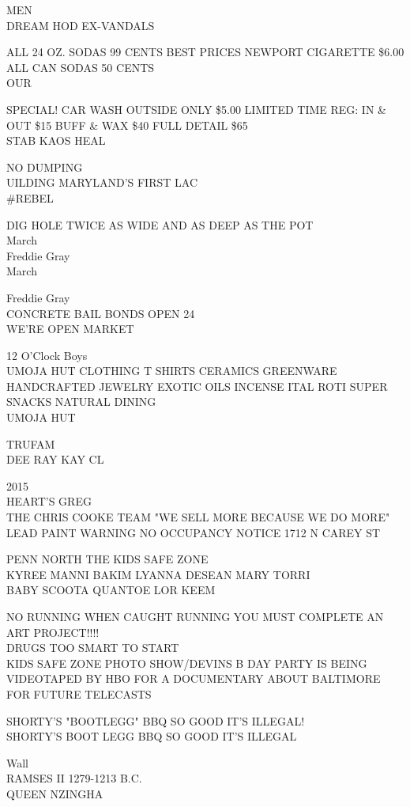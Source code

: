 \documentclass[10pt,letterpaper]{article}
\begin{document}
MEN\\
DREAM HOD EX{-}VANDALS

ALL 24 OZ. SODAS 99 CENTS BEST PRICES NEWPORT CIGARETTE \$6.00 ALL CAN SODAS 50 CENTS\\
OUR

SPECIAL!  CAR WASH OUTSIDE ONLY \$5.00 LIMITED TIME REG: IN \& OUT \$15 BUFF \& WAX \$40 FULL DETAIL \$65\\
STAB KAOS HEAL

NO DUMPING\\
UILDING MARYLAND'S FIRST LAC\\
\#REBEL

DIG HOLE TWICE AS WIDE AND AS DEEP AS THE POT\\
March\\
Freddie Gray\\
March

Freddie Gray\\
CONCRETE BAIL BONDS OPEN 24\\
WE'RE OPEN MARKET

12 O'Clock Boys\\
UMOJA HUT CLOTHING T SHIRTS CERAMICS GREENWARE HANDCRAFTED JEWELRY EXOTIC OILS INCENSE ITAL ROTI SUPER SNACKS NATURAL DINING\\
UMOJA HUT

TRUFAM\\
DEE RAY KAY CL

2015\\
HEART'S GREG\\
THE CHRIS COOKE TEAM "WE SELL MORE BECAUSE WE DO MORE"\\
LEAD PAINT WARNING NO OCCUPANCY NOTICE 1712 N CAREY ST

PENN NORTH THE KIDS SAFE ZONE\\
KYREE MANNI BAKIM LYANNA DESEAN MARY TORRI\\
BABY SCOOTA QUANTOE LOR KEEM

NO RUNNING WHEN CAUGHT RUNNING YOU MUST COMPLETE AN ART PROJECT!!!!\\
DRUGS TOO SMART TO START\\
KIDS SAFE ZONE PHOTO SHOW/DEVINS B DAY PARTY IS BEING VIDEOTAPED BY HBO FOR A DOCUMENTARY ABOUT BALTIMORE FOR FUTURE TELECASTS

SHORTY'S "BOOTLEGG" BBQ SO GOOD IT'S ILLEGAL!\\
SHORTY'S BOOT LEGG BBQ SO GOOD IT'S ILLEGAL

Wall\\
RAMSES II 1279{-}1213 B.C.\\
QUEEN NZINGHA
\end{document}
